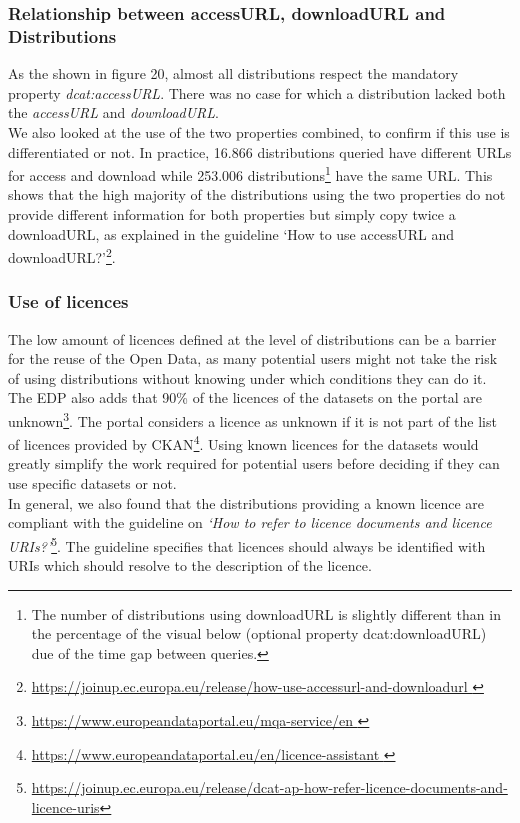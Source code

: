 \documentclass[<options>]{elsarticle}
\begin{document}
\subsubsection{Relationship between accessURL, downloadURL and Distributions}

As the shown in figure 20, almost all distributions respect the mandatory property \textit{dcat:accessURL}. There was no case for which a distribution lacked both the \textit{accessURL} and \textit{downloadURL}.\\
We also looked at the use of the two properties combined, to confirm if this use is differentiated or not. In practice, 16.866 distributions queried have different URLs for access and download while 253.006 distributions\footnote{The number of distributions using downloadURL is slightly different than in the percentage of the visual below (optional property dcat:downloadURL) due of the time gap between queries.}  have the same URL. This shows that the high majority of the distributions using the two properties do not provide different information for both properties but simply copy twice a downloadURL, as explained in the guideline ‘How to use accessURL and downloadURL?’\footnote{\href{   https://joinup.ec.europa.eu/release/how-use-accessurl-and-downloadurl }{https://joinup.ec.europa.eu/release/how-use-accessurl-and-downloadurl }}.

\subsubsection{Use of licences}
The low amount of licences defined at the level of distributions can be a barrier for the reuse of the Open Data, as many potential users might not take the risk of using distributions without knowing under which conditions they can do it. The EDP also adds that 90\% of the licences of the datasets on the portal are unknown\footnote{\href{https://www.europeandataportal.eu/mqa-service/en}{ https://www.europeandataportal.eu/mqa-service/en }}. The portal considers a licence as unknown if it is not part of the list of licences provided by CKAN\footnote{\href{https://www.europeandataportal.eu/en/licence-assistant}{ https://www.europeandataportal.eu/en/licence-assistant }}. Using known licences for the datasets would greatly simplify the work required for potential users before deciding if they can use specific datasets or not.\\
In general, we also found that the distributions providing a known licence are compliant with the guideline on \textit{‘How to refer to licence documents and licence URIs?’}\footnote{\href{https://joinup.ec.europa.eu/release/dcat-ap-how-refer-licence-documents-and-licence-uris}{  https://joinup.ec.europa.eu/release/dcat-ap-how-refer-licence-documents-and-licence-uris}}. The guideline specifies that licences should always be identified with URIs which should resolve to the description of the licence.
\end{document}
